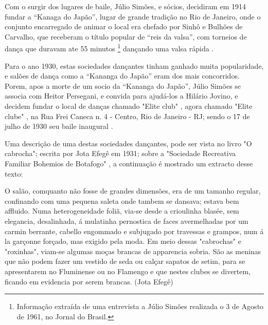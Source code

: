 Com o surgir dos lugares de baile, 
Júlio Simões, e sócios, decidiram em 1914 fundar a ``Kanaga do Japão'',
lugar de grande tradição no Rio de Janeiro,
onde o conjunto encarregado de animar o local era chefado por Sinhô e Bulhões de Carvalho,
que receberam o título popular de ``reis da valsa'',
com torneios de dança que duravam ate 55 
minutos \footnote{Informação extraída de uma entrevista a Júlio Simões realizada o 3 de Agosto de 1961, no Jornal do Brasil.} 
dançando uma valsa rápida \cite[pp. 6 - cad. B]{entrevistajuliojournalbrasil1}.

Para o ano 1930, estas sociedades dançantes tinham ganhado muita popularidade, e salões de dança como a
``Kananga do Japão'' eram dos mais concorridos. Porem,
apos a morte de um socio da ``Kananga do Japão'', 
Júlio Simões se associa com Heitor Persegani, e convida para ajudá-los a Hilário Jovino, 
e decidem fundar o local de danças chamado "Elite club" \cite[pp. 11]{eliteinaugura},
agora chamado "Elite clube" \cite[pp. 3]{juliosimoes},
na Rua Frei Caneca n. 4 - Centro, Rio de Janeiro - RJ;
sendo o 17 de julho de 1930 seu baile inaugural 
\cite[pp. 11]{eliteinaugura} \cite[pp. 3]{juliosimoes} \cite[pp. 10]{simoesjournalbrasil1}.

Uma descrição de uma destas sociedades dançantes, pode ser vista no livro "O cabrocha"; 
escrita  por Jota Efegê em 1931; 
sobre a "Sociedade Recreativa Familiar Bohemios de Botafogo" \cite[pp. 24-26]{jotaefege},
a continuação é mostrado um extracto desse texto:
\begin{citando}%
O salão, comquanto não fosse de grandes dimensões, era
de um tamanho regular, confinando com uma pequena saleta
onde tambem se dansava; estava bem affluido. Numa
heterogeneidade foliã, via-se desde a crioulinha blasée, sem
elegancia, desalinhada, á mulatinha pernostica de faces
avermelhadas por um carmin berrante, cabello engommado e
subjugado por travessas e grampos, num á la garçonne
forçado, mas exigido pela moda. Em meio dessas "cabrochas"
e "roxinhas", viam-se algumas moças brancas de apparencia
sobria. São as meninas que não podem fazer um vestido de
seda ou calçar sapatos de setim, para se apresentarem no
Fluminense ou no Flamengo e que nestes clubes se divertem,
ficando em evidencia por serem brancas.  %
(Jota Efegê)
\end{citando}



